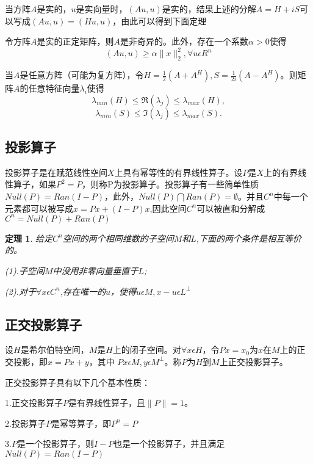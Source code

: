 \documentclass{article}
\begin{document}
当方阵$A$是实的，$u$是实向量时，$(Au,u)$是实的，结果上述的分解$A=H+iS$可以写成$(Au,u)=(Hu,u)$，由此可以得到下面定理

\begin{thm}
令方阵$A$是实的正定矩阵，则$A$是非奇异的。此外，存在一个系数$\alpha >0$使得
$$(Au,u)\geqslant \alpha \parallel x \parallel _2^2,\forall u\epsilon R^n$$
\end{thm}

\begin{thm}
当$A$是任意方阵（可能为复方阵），令$H=\frac{1}{2}(A+A^H),S=\frac{1}{2i}(A-A^H)$。则矩阵$A$的任意特征向量$\lambda _i$使得
$$\lambda_{min}(H)\leqslant \Re (\lambda _j)\leqslant \lambda_{max}(H),$$
$$\lambda_{min}(S)\leqslant \Im (\lambda _j)\leqslant \lambda_{max}(S).$$
\end{thm}

\subsection{投影算子}
投影算子是在赋范线性空间$X$上具有幂等性的有界线性算子。设$P$是$X$上的有界线性算子，如果$P^2=P$，则称P为投影算子。投影算子有一些简单性质$Null(P)=Ran(I-P)$，此外，$Null(P)\bigcap Ran(P)=\emptyset$。并且$C^n$中每一个元素都可以被写成$x=Px+(I-P)x$,因此空间$C^n$可以被直和分解成$C^n=Null(P)+Ran(P)$
\newtheorem{thm}{定理}
\begin{thm}
给定$C^n$空间的两个相同维数的子空间$M$和$L$,下面的两个条件是相互等价的。

(1).子空间$M$中没用非零向量垂直于$L$;

(2).对于$\forall x\epsilon C^n$,存在唯一的$u$，使得$u\epsilon M,x-u\epsilon L^\bot$
\end{thm}

\subsection{正交投影算子}
\begin{definition}
设$H$是希尔伯特空间，$M$是$H$上的闭子空间。对$\forall x\epsilon H$，令$Px=x_0$为$x$在$M$上的正交投影，即$x=Px+y$，其中 $Px\epsilon M,y\epsilon M^\perp$。称$P$为$H$到$M$上正交投影算子。
\end{definition}

正交投影算子具有以下几个基本性质：

1.正交投影算子$P$是有界线性算子，且$\parallel P \parallel=1$。

2.投影算子$P$是幂等算子，即$P^n=P$

3.$P$是一个投影算子，则$I-P$也是一个投影算子，并且满足$Null(P)=Ran(I-P)$
\end{document}
